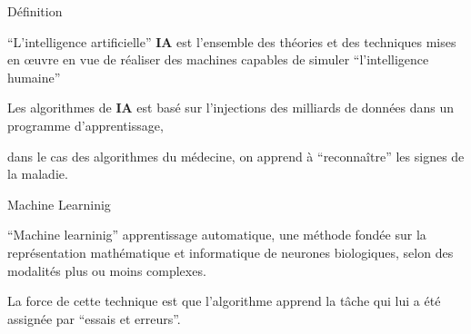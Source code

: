 \begin{frame}{Définition}
    \begin{itemize}[<+-|alert@+>]
        \myitem
            ``L'intelligence artificielle'' \textbf{IA} est l'ensemble des théories
            et des techniques mises en œuvre en vue de réaliser des
            machines capables de simuler ``l'intelligence humaine''

        \myitem
            Les algorithmes de \textbf{IA} est basé sur  l'injections des
            milliards de données dans un programme d'apprentissage,

        \myitem
        dans le cas des algorithmes du médecine, on apprend à ``reconnaître''
        les signes de la maladie.\mybox
    \end{itemize}

\end{frame}

\begin{frame}{Machine Learninig}
    \begin{itemize}[<+-|alert@+>]
        \myitem
        ``Machine learninig'' apprentissage automatique, une méthode fondée sur
        la représentation mathématique et informatique de neurones
        biologiques, selon des modalités plus ou moins complexes.

        \myitem
        La force de cette technique est que l'algorithme apprend la
        tâche qui lui a été assignée par ``essais et erreurs''.\mybox
    \end{itemize}

    \vspace{80mm}

\end{frame}

